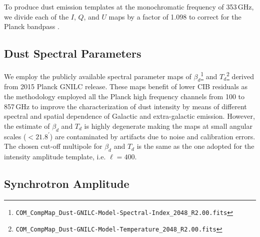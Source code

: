 
To produce dust emission templates at the monochromatic frequency of 353\,GHz, we divide each of the $I$, $Q$, and $U$ maps by a factor of 1.098 to correct for the Planck bandpass \citep[][Table~2]{planck2016-l11A}.



\subsection{Dust Spectral Parameters}
We employ the publicly available spectral parameter maps of $\beta_d$\footnote {\texttt{COM\_CompMap\_Dust-GNILC-Model-Spectral-Index\_2048\_R2.00.fits}} and $T_d$\footnote{\texttt{COM\_CompMap\_Dust-GNILC-Model-Temperature\_2048\_R2.00.fits}} derived from 2015 Planck GNILC release. These maps benefit of lower CIB residuals as the methodology employed all the Planck  high frequency channels from 100 to 857\,GHz to improve the characterization of dust intensity by means of different spectral and spatial dependence of Galactic and extra-galactic emission. However, the estimate of $\beta_d$ and $T_d$ is highly degenerate making the maps at small angular scales ($<21.8^\prime$) are contaminated by artifacts due to noise and calibration errors. The chosen cut-off multipole for $\beta_d$ and $T_d$ is the same as the one adopted for the intensity amplitude template, i.e. $\ell=400 $.  

\subsection{Synchrotron Amplitude}

